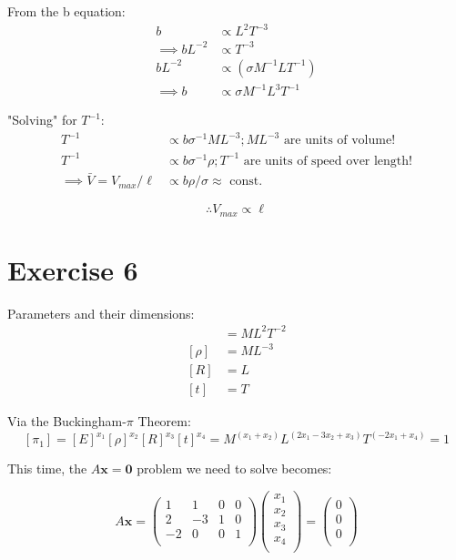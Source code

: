 \documentclass{article}
\begin{document}
From the b equation:
\begin{align}
b &\propto L^2 T^{-3} \\
\implies bL^{-2} &\propto T^{-3} \\
bL^{-2} &\propto  (\sigma M^{-1} L T^{-1}) \\
\implies b &\propto \sigma M^{-1} L^3 T^{-1} 
\end{align}

"Solving" for $T^{-1}$:
\begin{align}
T^{-1} &\propto b \sigma^{-1} ML^{-3} ; ML^{-3} \text{ are units of volume!} \\
T^{-1} &\propto b \sigma^{-1} \rho ; T^{-1} \text{ are units of speed over length!} \\
\implies \bar{V} = V_{max}/\ell &\propto b \rho / \sigma \approx \text{ const.}
\end{align}

\[ \therefore V_{max} \propto \ell \]

\section{Exercise 6}

Parameters and their dimensions: \begin{align}
[E] &= ML^2T^{-2} \\
[\rho] &= ML^{-3} \\
[R] &= L \\
[t] &= T
\end{align}

Via the Buckingham-$\pi$ Theorem:
\[ [\pi_1] = [E]^{x_1}[\rho]^{x_2}[R]^{x_3}[t]^{x_4} = M^{(x_1+x_2)}L^{(2x_1-3x_2+x_3)}T^{(-2x_1+x_4)} = 1\]

This time, the $A\bm{x}=\bm{0}$ problem we need to solve becomes:

\begin{equation}
A\bm{x} = \begin{pmatrix}
1&1&0&0 \\
2&-3&1&0 \\
-2&0&0&1 \\
\end{pmatrix}
\begin{pmatrix}
x_1\\
x_2\\
x_3\\
x_4\\
\end{pmatrix}
=
\begin{pmatrix}
0\\
0\\
0\\
\end{pmatrix}
\end{equation}
\end{document}
